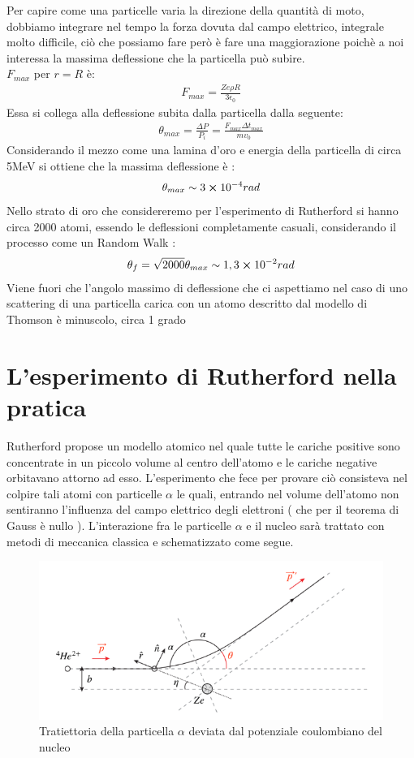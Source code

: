 Per capire come una particelle varia la direzione della quantità di moto, dobbiamo integrare
nel tempo la forza dovuta dal campo elettrico, integrale molto difficile, ciò che possiamo fare però è fare una maggiorazione poichè a noi interessa
la massima deflessione che la particella può subire.\\
$F_{max}$ per $r=R$ è:
\begin{align*}
    F_{max} = \frac{Ze\rho R}{3\epsilon_{0}}
\end{align*}
Essa si collega alla deflessione subita dalla particella dalla seguente:
\begin{align*}
        \theta_{max} = \frac{\Delta P}{P_{i}} = \frac{F_{max}\Delta t_{max}}{mv_{0}}
\end{align*}
Considerando il mezzo come una lamina d'oro e energia della particella di circa 5MeV si 
ottiene che la massima deflessione è :
\begin{align*}
    \theta_{max} \sim 3\cross10^{-4}rad
\end{align*}
Nello strato di oro che considereremo per l'esperimento di Rutherford si hanno circa 2000 atomi, 
essendo le deflessioni completamente casuali, considerando il processo come un Random Walk :
\begin{align*}
    \theta_{f} = \sqrt{2000}\theta_{max} \sim 1,3\cross10^{-2}rad
\end{align*}
Viene fuori che l'angolo massimo di deflessione che ci aspettiamo nel caso di uno scattering 
di una particella carica con un atomo descritto dal modello di Thomson è minuscolo, circa 
1 grado
\section{L'esperimento di Rutherford nella pratica}
Rutherford propose un modello atomico nel quale tutte le cariche positive sono concentrate 
in un piccolo volume al centro dell'atomo e le cariche negative orbitavano attorno ad esso.
L'esperimento che fece per provare ciò consisteva nel colpire tali atomi con particelle 
$\alpha$ le quali, entrando nel volume dell'atomo non sentiranno l'influenza del campo elettrico 
degli elettroni ( che per il teorema di Gauss è nullo ).
L'interazione fra le particelle $\alpha$ e il nucleo sarà trattato con metodi di meccanica 
classica e schematizzato come segue.
\begin{figure}[!h]
    \centering
    \includegraphics[scale=0.5]{ch5Ratherford/Rutherford}
    \caption{Tratiettoria della particella $\alpha$ deviata dal potenziale coulombiano del nucleo}
\end{figure}

